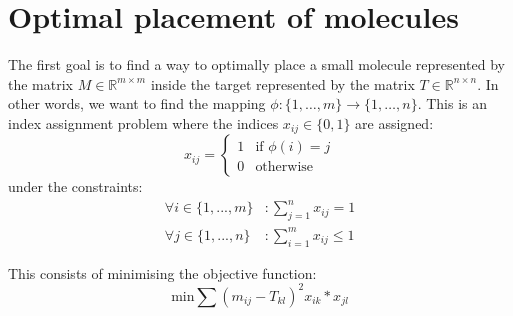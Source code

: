 \documentclass[11pt,a4paper]{article}
\begin{document}
\section{Optimal placement of molecules}
The first goal is to find a way to optimally place a small molecule represented by the matrix $M \in \mathbb{R}^{m \times m}$ inside the target represented by the matrix $T \in \mathbb{R}^{n \times n}$. 
In other words, we want to find the mapping $\phi : \{1, \dots, m\} \to \{1, \dots, n\}$. This is an index assignment problem where the indices $x_{ij} \in \{0, 1\}$ are assigned:
\begin{equation*}
    x_{ij} = 
    \begin{cases}
        1 & \text{if } \phi(i) = j \\
        0 & \text{otherwise}
    \end{cases}
\end{equation*}
under the constraints:
\begin{align*}
    \forall i \in \{1, ..., m\} &: \sum_{j=1}^n x_{ij} = 1 \\
    \forall j \in \{1, ..., n\} &: \sum_{i=1}^m x_{ij} \leq 1 
\end{align*}

This consists of minimising the objective function:
\begin{equation*}
    \mathrm{min} \sum (m_{ij} - T_{kl})^2 x_{ik} * x_{jl}
\end{equation*}
\end{document}
